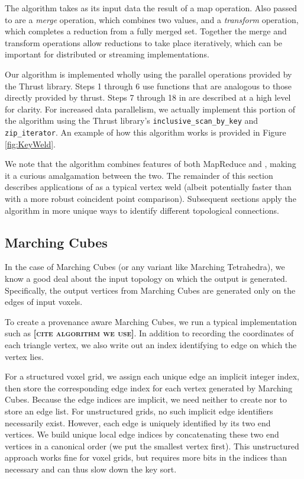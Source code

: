 \documentclass[10pt,journal,cspaper,compsoc]{IEEEtran}
\newcommand{\fix}[1]{{\color{red}\textbf{\textsc{[#1]}}}}
\begin{document}
The  algorithm takes as its input data the result of a map
operation.  Also passed to  are a \emph{merge} operation, which
combines two values, and a \emph{transform} operation, which completes a
reduction from a fully merged set.  Together the merge and transform
operations allow reductions to take place iteratively, which can be
important for distributed or streaming implementations.

Our  algorithm is implemented wholly using the parallel
operations provided by the Thrust library.  Steps 1 through 6 use functions
that are analogous to those directly provided by thrust.
Steps 7 through 18 in  are described at a high level for clarity. For increased data parallelism, we actually implement this portion of the algorithm using the Thrust library's \texttt{inclusive\_scan\_by\_key} and \texttt{zip\_iterator}. An example of how this algorithm works is provided in Figure \ref{fig:KeyWeld}.

We note that the  algorithm combines features of both
MapReduce and , making it a curious amalgamation between
the two.  The remainder of this section describes applications of
 as a typical vertex weld (albeit potentially faster than
 with a more robust coincident point comparison).
Subsequent sections apply the  algorithm in more
unique ways to identify different topological connections.

\subsection{Marching Cubes}
\label{sec:MarchingCubes}

In the case of Marching Cubes (or any variant like Marching Tetrahedra), we
know a good deal about the input topology on which the output is
generated. Specifically, the output vertices from Marching Cubes are
generated only on the edges of input voxels.

To create a provenance aware Marching Cubes, we run a typical
implementation such as \fix{cite algorithm we use}.  In addition to
recording the coordinates of each triangle vertex, we also write out an
index identifying to edge on which the vertex lies.

For a structured voxel grid, we assign each unique edge an implicit integer
index, then store the corresponding edge index for each vertex generated by
Marching Cubes.  Because the edge indices are implicit, we need neither to
create nor to store an edge list.  For unstructured grids, no such implicit
edge identifiers necessarily exist.  However, each edge is uniquely
identified by its two end vertices.  We build unique local edge indices by
concatenating these two end vertices in a canonical order (we put the
smallest vertex first).  This unstructured approach works fine for voxel
grids, but requires more bits in the indices than necessary and can thus
slow down the key sort.
\end{document}
